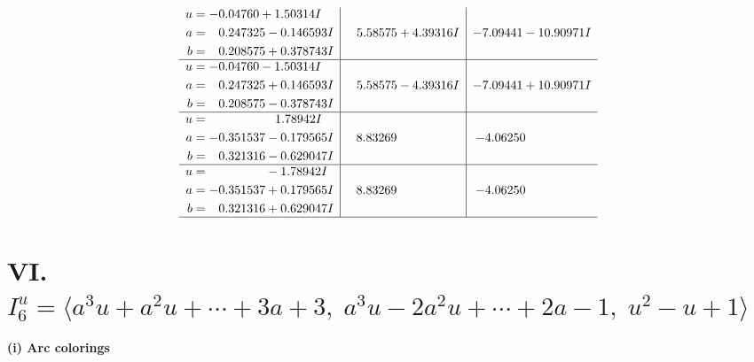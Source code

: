 \documentclass[1p]{elsarticle_modified}
\theoremstyle{definition}
\begin{document}
$$\begin{array}{c|c|c}
\begin{aligned}
u &= -0.04760 + 1.50314 I \\
a &= \phantom{-}0.247325 - 0.146593 I \\
b &= \phantom{-}0.208575 + 0.378743 I\end{aligned}
 & \phantom{-}5.58575 + 4.39316 I & -7.09441 - 10.90971 I \\ \hline\begin{aligned}
u &= -0.04760 - 1.50314 I \\
a &= \phantom{-}0.247325 + 0.146593 I \\
b &= \phantom{-}0.208575 - 0.378743 I\end{aligned}
 & \phantom{-}5.58575 - 4.39316 I & -7.09441 + 10.90971 I \\ \hline\begin{aligned}
u &= \phantom{-0.000000 -}1.78942 I \\
a &= -0.351537 - 0.179565 I \\
b &= \phantom{-}0.321316 - 0.629047 I\end{aligned}
 & \phantom{-}8.83269\phantom{ +0.000000I} & -4.06250\phantom{ +0.000000I} \\ \hline\begin{aligned}
u &= \phantom{-0.000000 } -1.78942 I \\
a &= -0.351537 + 0.179565 I \\
b &= \phantom{-}0.321316 + 0.629047 I\end{aligned}
 & \phantom{-}8.83269\phantom{ +0.000000I} & -4.06250\phantom{ +0.000000I}\\
 \hline 
 \end{array}$$\newpage\newpage\renewcommand{\arraystretch}{1}
\centering \section*{VI. $I^u_{6}= \langle a^3 u+a^2 u+\cdots+3 a+3,\;a^3 u-2 a^2 u+\cdots+2 a-1,\;u^2- u+1 \rangle$}
\flushleft \textbf{(i) Arc colorings}\\
\end{document}
